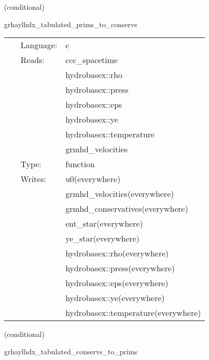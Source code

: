 \vspace{5mm}

   (conditional) 

\hspace{5mm} grhaylhdx\_tabulated\_prims\_to\_conservs 

\hspace{5mm}{\it tabulated version of grhaylhdx\_prims\_to\_conservs } 


\hspace{5mm}

 \begin{tabular*}{160mm}{cll} 
~ & Language:  & c \\ 
~ & Reads:  & ccc\_spacetime \\ 
~& ~ &hydrobasex::rho\\ 
~& ~ &hydrobasex::press\\ 
~& ~ &hydrobasex::eps\\ 
~& ~ &hydrobasex::ye\\ 
~& ~ &hydrobasex::temperature\\ 
~& ~ &grmhd\_velocities\\ 
~ & Type:  & function \\ 
~ & Writes:  & u0(everywhere) \\ 
~& ~ &grmhd\_velocities(everywhere)\\ 
~& ~ &grmhd\_conservatives(everywhere)\\ 
~& ~ &ent\_star(everywhere)\\ 
~& ~ &ye\_star(everywhere)\\ 
~& ~ &hydrobasex::rho(everywhere)\\ 
~& ~ &hydrobasex::press(everywhere)\\ 
~& ~ &hydrobasex::eps(everywhere)\\ 
~& ~ &hydrobasex::ye(everywhere)\\ 
~& ~ &hydrobasex::temperature(everywhere)\\ 
\end{tabular*} 


\vspace{5mm}

   (conditional) 

\hspace{5mm} grhaylhdx\_tabulated\_conservs\_to\_prims 

\hspace{5mm}{\it tabulated version of grhaylhdx\_conservs\_to\_prims } 


